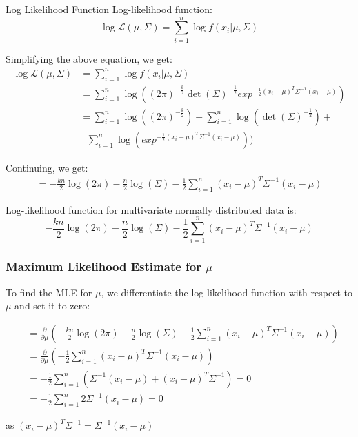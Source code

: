 \documentclass[handout]{beamer}
\begin{document}
\begin{frame}{Log Likelihood Function}
    Log-likelihood function:
    \begin{equation}
        \log \mathcal{L}(\mu, \Sigma) = \sum_{i=1}^n \log f(x_i|\mu, \Sigma)
    \end{equation}

    Simplifying the above equation, we get:
    \begin{align*}
        \log \mathcal{L}(\mu, \Sigma) &= \sum_{i=1}^n \log f(x_i|\mu, \Sigma) \\
        &= \sum_{i=1}^n \log \left((2\pi)^{-\frac{k}{2}}\det(\Sigma)^{-\frac{1}{2}}exp^{-\frac{1}{2}(x_i-\mu)^{T}\Sigma^{-1}(x_i-\mu)} \right) \\
        &= \sum_{i=1}^n \log ((2\pi)^{-\frac{k}{2}}) + \sum_{i=1}^n \log (\det(\Sigma)^{-\frac{1}{2}}) + \\ & \ \ \ \sum_{i=1}^n \log(exp^{-\frac{1}{2}(x_i-\mu)^{T}\Sigma^{-1}(x_i-\mu)} )) 
        \end{align*}
\end{frame}

\begin{frame}
    Continuing, we get:
    \begin{align*}
        = -\frac{kn}{2}\log(2\pi) -\frac{n}{2}\log(\Sigma) -\frac{1}{2}\sum_{i=1}^n (x_i-\mu)^T\Sigma^{-1}(x_i-\mu)  
        \end{align*}

    \begin{tcolorbox}[colback=metropolisblue!5,colframe=metropolisblue,title=Log Likelihood Function for Multivariate Normal Distribution]
            Log-likelihood function for multivariate normally distributed data is:
            \[
                -\frac{kn}{2}\log(2\pi) -\frac{n}{2}\log(\Sigma) -\frac{1}{2}\sum_{i=1}^n (x_i-\mu)^T\Sigma^{-1}(x_i-\mu)
                \]
        \end{tcolorbox}
\end{frame}

\begin{frame}
    \frametitle{Maximum Likelihood Estimate for $\mu$}
    
    To find the MLE for $\mu$, we differentiate the log-likelihood function with respect to $\mu$ and set it to zero:
    
    \begin{align*}
      &=\frac{\partial}{\partial \mu} \left(-\frac{kn}{2}\log(2\pi) -\frac{n}{2}\log(\Sigma) -\frac{1}{2}\sum_{i=1}^n (x_i-\mu)^T\Sigma^{-1}(x_i-\mu)\right) \\
      &= \frac{\partial}{\partial \mu} \left(-\frac{1}{2} \sum_{i=1}^n (x_i-\mu)^T\Sigma^{-1}(x_i-\mu)\right) \\
      &= -\frac{1}{2}\sum_{i=1}^n \left(\Sigma^{-1}(x_i-\mu) + (x_i-\mu)^T\Sigma^{-1} \right) = 0\\
      &= -\frac{1}{2} \sum_{i=1}^n 2\Sigma^{-1}(x_i-\mu) = 0 
    \end{align*} \centerline{as $(x_i-\mu)^{T}\Sigma^{-1} = \Sigma^{-1}(x_i-\mu)$}
    
\end{frame}
\end{document}
